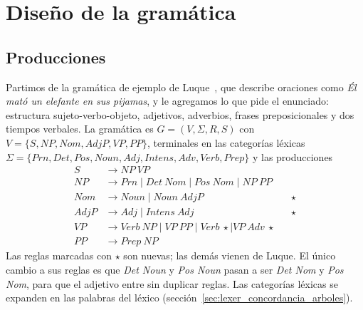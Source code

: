 \section{Diseño de la gramática}
\label{sec:gramatica}

\subsection{Producciones}

Partimos de la gramática de ejemplo de Luque~\cite{luque}, que describe oraciones como
\emph{Él mató un elefante en sus pijamas}, y le agregamos lo que pide el enunciado: estructura
sujeto-verbo-objeto, adjetivos, adverbios, frases preposicionales y dos tiempos verbales. La
gramática es $G = (V, \Sigma, R, S)$ con
$V = \{S, NP, Nom, AdjP, VP, PP\}$, terminales en las categorías léxicas
$\Sigma = \{\textit{Prn}, \textit{Det}, \textit{Pos}, \textit{Noun}, \textit{Adj},
\textit{Intens}, \textit{Adv}, \textit{Verb}, \textit{Prep}\}$ y las producciones
\begin{align*}
  S    &\to NP\ VP \\
  NP   &\to \textit{Prn} \mid \textit{Det}\ Nom \mid \textit{Pos}\ Nom \mid NP\ PP \\
  Nom  &\to \textit{Noun} \mid \textit{Noun}\ AdjP                      && \star \\
  AdjP &\to \textit{Adj} \mid \textit{Intens}\ \textit{Adj}             && \star \\
  VP   &\to \textit{Verb}\ NP \mid VP\ PP \mid \textit{Verb}\ \star \mid VP\ \textit{Adv}\ \star \\
  PP   &\to \textit{Prep}\ NP
\end{align*}
Las reglas marcadas con $\star$ son nuevas; las demás vienen de Luque. El único cambio a sus
reglas es que \textit{Det Noun} y \textit{Pos Noun} pasan a ser \textit{Det Nom} y \textit{Pos
Nom}, para que el adjetivo entre sin duplicar reglas. Las categorías léxicas se expanden en
las palabras del léxico (sección~\ref{sec:lexer_concordancia_arboles}).

